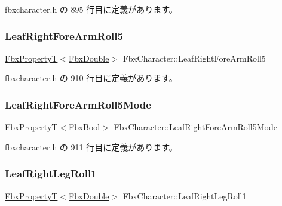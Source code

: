  fbxcharacter.\+h の 895 行目に定義があります。

\mbox{\label{class_fbx_character_afa3c3fcb690fce868b1b6b77f9be9ca3}} 
\subsubsection{\texorpdfstring{Leaf\+Right\+Fore\+Arm\+Roll5}{LeafRightForeArmRoll5}}
{\footnotesize\ttfamily \hyperlink{class_fbx_property_t}{Fbx\+PropertyT}$<$\hyperlink{fbxtypes_8h_a171e72a1c46fc15c1a6c9c31948c1c5b}{Fbx\+Double}$>$ Fbx\+Character\+::\+Leaf\+Right\+Fore\+Arm\+Roll5}



 fbxcharacter.\+h の 910 行目に定義があります。

\mbox{\label{class_fbx_character_a00d5ad06ba8a7e85f18ff4907b924eb5}} 
\subsubsection{\texorpdfstring{Leaf\+Right\+Fore\+Arm\+Roll5\+Mode}{LeafRightForeArmRoll5Mode}}
{\footnotesize\ttfamily \hyperlink{class_fbx_property_t}{Fbx\+PropertyT}$<$\hyperlink{fbxtypes_8h_a92e0562b2fe33e76a242f498b362262e}{Fbx\+Bool}$>$ Fbx\+Character\+::\+Leaf\+Right\+Fore\+Arm\+Roll5\+Mode}



 fbxcharacter.\+h の 911 行目に定義があります。

\mbox{\label{class_fbx_character_aa1841fa4418840236b459f9cb04c1244}} 
\subsubsection{\texorpdfstring{Leaf\+Right\+Leg\+Roll1}{LeafRightLegRoll1}}
{\footnotesize\ttfamily \hyperlink{class_fbx_property_t}{Fbx\+PropertyT}$<$\hyperlink{fbxtypes_8h_a171e72a1c46fc15c1a6c9c31948c1c5b}{Fbx\+Double}$>$ Fbx\+Character\+::\+Leaf\+Right\+Leg\+Roll1}



